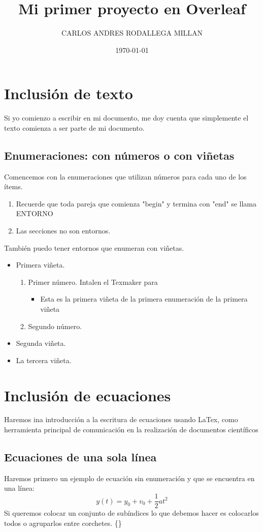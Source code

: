\documentclass[onecolumn]{article} %
\title{Mi primer proyecto en Overleaf}
\author{CARLOS ANDRES RODALLEGA MILLAN}
\date{\today}
\begin{document}
\maketitle %
\section{Inclusión de texto} %
Si yo comienzo a escribir en mi documento, me doy cuenta que simplemente el texto comienza a ser parte de mi documento.
\subsection{Enumeraciones: con números o con viñetas}
Comencemos con la enumeraciones que utilizan números para cada uno de los ítems.
\begin{enumerate}
    \item Recuerde que toda pareja que comienza "begin" y termina con "end" se llama ENTORNO
    \item Las secciones no son entornos.
\end{enumerate}
También puedo tener entornos que enumeran con viñetas.
\begin{itemize}
    \item Primera viñeta.
    \begin{enumerate}
        \item Primer número.
        Intalen el Texmaker para   
        \begin{itemize}
            \item Esta es la primera viñeta de la primera enumeración de la primera viñeta
        \end{itemize}
        \item Segundo número.
    \end{enumerate}
    \item Segunda viñeta.
    \item La tercera viñeta.
\end{itemize}
\section{Inclusión de ecuaciones} %
Haremos ina introducción a la escritura de ecuaciones usando LaTex, como herramienta principal de comunicación en la realización de documentos científicos
\subsection{Ecuaciones de una sola línea}
Haremos primero un ejemplo de ecuación sin enumeración y que se encuentra en una línea:
$$y(t)=y_0+v_0+\frac{1}{2}at^2$$
Si queremos colocar un conjunto de subíndices lo que debemos hacer es colocarlos todos o agruparlos entre corchetes. \{\}
\end{document}
